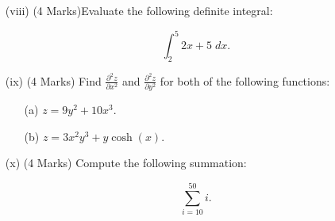 \documentclass[a4paper,12pt]{article}
\begin{document}
\begin{itemize}
\begin{multicols}{2}
\begin{itemize}
	\end{itemize}
	\end{multicols}

	\smallskip
	\item[(viii)] (4 Marks)Evaluate the following definite integral:
	
	\[  \int^{5}_{2}  2x+5\; dx.  \]
	\smallskip

	
%	
	
	
	\item[(ix)] (4 Marks) Find $\displaystyle{ \frac{ \partial^2 z }{ \partial x^2 }}$ and $\displaystyle{ \frac{ \partial^2 z }{ \partial y^2 }}$  for both of the following functions:
\smallskip
	\begin{multicols}{2}
		\begin{itemize}
			\item[(a)] $\displaystyle{  z = 9y^2 +10x^3. }  $
				\item[(b)] $\displaystyle{  z = 3x^2y^3 + y\cosh(x).}$
				
			\end{itemize}
		\end{multicols}
		\medskip
	\item[(x)] (4 Marks)  Compute the following summation:
	
	\[ \sum_{i=10}^{50} i . \]
\end{itemize}





	

	
%		
%
%
%		
%
\end{document}
